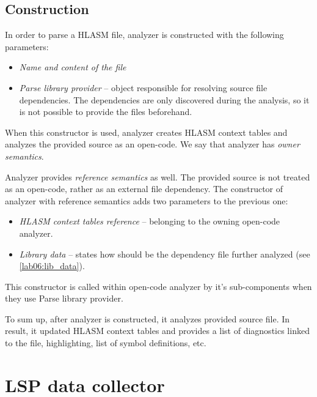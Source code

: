 \subsection{Construction}

In order to parse a HLASM file, analyzer is constructed with the following parameters:
\begin{itemize}
	\item \emph{Name and content of the file}
	\item \emph{Parse library provider} -- object responsible for resolving source file dependencies. The dependencies are only discovered during the analysis, so it is not possible to provide the files beforehand.
\end{itemize}

When this constructor is used, analyzer creates HLASM context tables and analyzes the provided source as an open-code. We say that analyzer has \emph{owner semantics}. 
 
Analyzer provides \emph{reference semantics} as well. The provided source is not treated as an open-code, rather as an external file dependency. The constructor of analyzer with reference semantics adds two parameters to the previous one:
\begin{itemize}
	\item \emph{HLASM context tables reference} -- belonging to the owning open-code analyzer.
	\item \emph{Library data} -- states how should be the dependency file further analyzed (see \cref{lab06:lib_data}).
\end{itemize}

This constructor is called within open-code analyzer by it's sub-components when they use Parse library provider.

\vspace{0.5cm}

To sum up, after analyzer is constructed, it analyzes provided source file. In result, it updated HLASM context tables and provides a list of diagnostics linked to the file, highlighting, list of symbol definitions, etc.

\section{LSP data collector}




